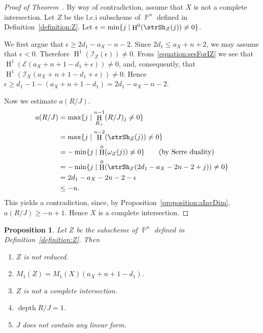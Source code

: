 \documentclass[11pt,a4paper]{amsart}
\theoremstyle{plain}
\newtheorem{proposition}[equation]{Proposition}
\theoremstyle{definition}
\newcommand{\calE}{\mathcal E}
\newcommand{\calI}{\mathcal I}
\DeclareMathOperator{\projective}{\mathbb{P}}
\DeclareMathOperator{\depth}{depth}
\DeclareMathOperator{\homology}{H}
\begin{document}
\begin{proof}[Proof of Theorem~\protect{\ref{theorem:minHOne}}]
%
By way of contradiction, 
assume that $X$ is not a complete intersection.  
Let $Z$ be the l.c.i subscheme of $\projective^n$ defined in
Definition~\ref{definition:Z}.
Let $\epsilon = \min \{ j \mid \homology^0(\strSh_Z(j)) \neq 0\}$.

We first argue that $\epsilon \geq  2d_1 - a_X -n -2$.
Since $2d_1 \leq a_X +n +2$, we may assume that $\epsilon < 0$.
Therefore $\homology^1(\calI_Z(\epsilon)) \neq 0$.
From~\eqref{equation:sesForIZ} we see that 
$\homology^1(\calE(a_X + n + 1-d_1 + \epsilon)) \neq 0$, and, consequently,
that
$\homology^1(\calI_X(a_X + n + 1-d_1 + \epsilon)) \neq 0$.
Hence $\epsilon \geq d_1-1 - (a_X+n+1-d_1) = 2d_1 - a_X -n -2$.

Now we estimate $a(R/J)$.
\begin{align*}
%
a(R/J) & = \max \{j \mid \homology^{n-1}_{R_+}(R/J)_j \neq 0\}
\\
& = \max \{j \mid \homology^{n-2}(\strSh_Z(j)) \neq 0\}
\\
& = - \min \{j \mid \homology^{0}(\omega_Z(j)) \neq 0\} \qquad 
\text{(by Serre duality)}
\\
& = - \min \{j \mid \homology^{0}(\strSh_Z(2d_1-a_X-2n-2+j)) \neq 0\}
\\
& = 2d_1-a_X-2n-2- \epsilon
\\
& \leq -n.
\end{align*}
This yields a contradiction, since, by
Proposition~\ref{proposition:aInvDim},
$a(R/J) \geq -n+1$.
Hence $X$ is a complete intersection.
\end{proof}

\begin{proposition}
\label{proposition:Z}
Let $Z$ be the subscheme of $\projective^n$ defined in
Definition~\ref{definition:Z}.
Then 
\begin{enumerate}

\item
\label{proposition:Z:notred}
$Z$ is not reduced.

\item
\label{proposition:Z:M}
$M_1(Z) = M_1(X)(a_X+n+1-d_1)$.

\item
\label{proposition:Z:notCI}
$Z$ is not a complete intersection.

\item
\label{proposition:Z:depthRJ}
$\depth R/J = 1$.

\item
\label{proposition:Z:JnoLin}
$J$ does not contain any linear form.

\end{enumerate}
\end{proposition}
\end{document}
